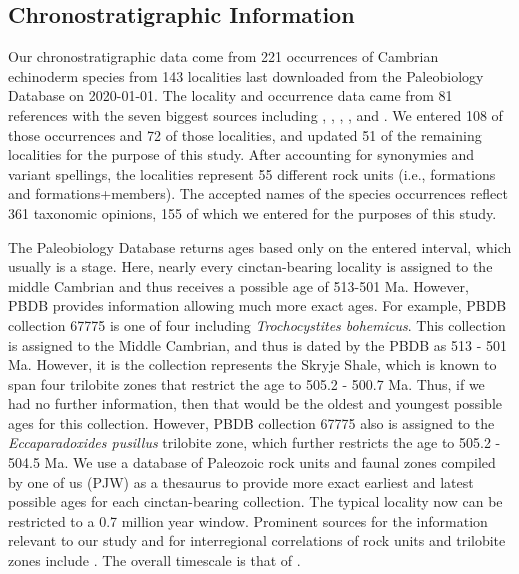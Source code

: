 \documentclass{article}
\begin{document}
\subsection{Chronostratigraphic Information}
Our chronostratigraphic data come from 221 occurrences of Cambrian echinoderm species from 143 localities last downloaded from the Paleobiology Database on 2020-01-01.  The locality and occurrence data came from 81 references with the seven biggest sources including \citet{Nardin2017}, \citet{Zamora2009}, \citet{Chlupac1998}, \citet{Sprinkle2006}, \citet{Termier1973} and \citet{Sprinkle1973}. We entered 108 of those occurrences and 72 of those localities, and updated 51 of the remaining localities for the purpose of this study.  After accounting for synonymies and variant spellings, the localities represent 55 different rock units (i.e., formations and formations+members).  The accepted names of the species occurrences reflect 361 taxonomic opinions, 155 of which we entered for the purposes of this study.

The Paleobiology Database returns ages based only on the entered interval, which usually is a stage. Here, nearly every cinctan-bearing locality is assigned to the middle Cambrian and thus receives a possible age of 513-501 Ma. However, PBDB provides information allowing much more exact ages. For example, PBDB collection 67775 is one of four including \textit{Trochocystites bohemicus}. This collection is assigned to the Middle Cambrian, and thus is dated by the PBDB as 513 - 501 Ma. However, it is the collection represents the Skryje Shale, which is known to span four trilobite zones that restrict the age to 505.2 - 500.7 Ma. Thus, if we had no further information, then that would be the oldest and youngest possible ages for this collection. However, PBDB collection 67775 also is assigned to the \textit{Eccaparadoxides pusillus} trilobite zone, which further restricts the age to 505.2 - 504.5 Ma. We use a database of Paleozoic rock units and faunal zones compiled by one of us (PJW) as a thesaurus to provide more exact earliest and latest possible ages for each cinctan-bearing collection. The typical locality now can be restricted to a 0.7 million year window. Prominent sources for the information relevant to our study and for interregional correlations of rock units and trilobite zones include \cite{Alvaro2001, Linan2004, Geyer2006, Geyer2000, Alvaro2007, Geyer2019}.  The overall timescale is that of \cite{Gradstein2012}. 
\end{document}
